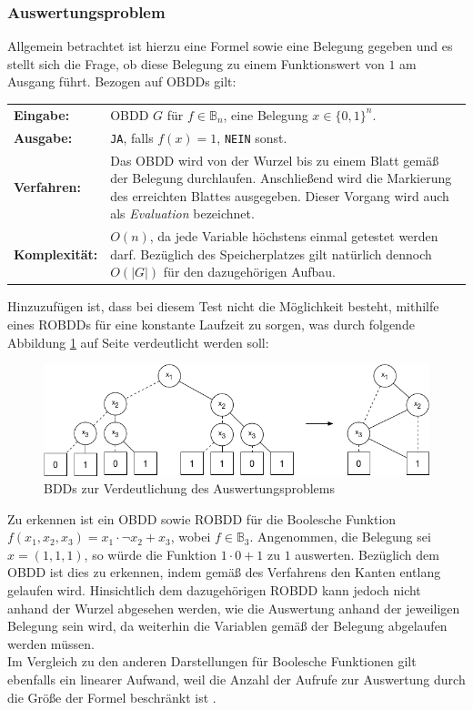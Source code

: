 \subsubsection{Auswertungsproblem}
\label{sec:auswertung}
Allgemein betrachtet ist hierzu eine Formel sowie eine Belegung gegeben und es stellt sich die Frage, ob diese Belegung zu einem Funktionswert von $1$ am Ausgang führt. Bezogen auf OBDDs gilt:\\
\begin{tabular}{l|p{12cm}}
	\textbf{Eingabe:} & OBDD $G$ für $f \in \mathbb{B}_n$, eine Belegung $x \in \{ 0, 1 \}^n$. \\ 
	\textbf{Ausgabe:} & \texttt{JA}, falls $f(x) = 1$, \texttt{NEIN} sonst. \\ 
	\textbf{Verfahren:} & Das OBDD wird von der Wurzel bis zu einem Blatt gemäß der Belegung durchlaufen. Anschließend wird die Markierung des erreichten Blattes ausgegeben. Dieser Vorgang wird auch als \emph{Evaluation} bezeichnet.\\
	\textbf{Komplexität:} & $O(n)$, da jede Variable höchstens einmal getestet werden darf. Bezüglich des Speicherplatzes gilt natürlich dennoch $O(|G|)$ für den dazugehörigen Aufbau.
\end{tabular}
\noindent
Hinzuzufügen ist, dass bei diesem Test nicht die Möglichkeit besteht, mithilfe eines ROBDDs für eine konstante Laufzeit zu sorgen, was durch folgende Abbildung \ref{fig:auswertung} auf Seite \pageref{fig:auswertung} verdeutlicht werden soll:
\newpage
\begin{figure}[bth]
	\centering
	\includegraphics[scale=0.5]{./img/auswertung}
	\caption[BDDs zur Verdeutlichung des Auswertungsproblems]{BDDs zur Verdeutlichung des Auswertungsproblems}
	\label{fig:auswertung}
\end{figure}
Zu erkennen ist ein OBDD sowie ROBDD für die Boolesche Funktion $f(x_1, x_2, x_3) = x_1 \cdot \neg x_2 + x_3$, wobei $f \in \mathbb{B}_3$. Angenommen, die Belegung sei $x = (1,1,1)$, so würde die Funktion $1 \cdot 0 + 1$ zu $1$ auswerten. Bezüglich dem OBDD ist dies zu erkennen, indem gemäß des Verfahrens den Kanten entlang gelaufen wird. Hinsichtlich dem dazugehörigen ROBDD kann jedoch nicht anhand der Wurzel abgesehen werden, wie die Auswertung anhand der jeweiligen Belegung sein wird, da weiterhin die Variablen gemäß der Belegung abgelaufen werden müssen.\\
Im Vergleich zu den anderen Darstellungen für Boolesche Funktionen gilt ebenfalls ein linearer Aufwand, weil die Anzahl der Aufrufe zur Auswertung durch die Größe der Formel beschränkt ist \cite{m2007}.

